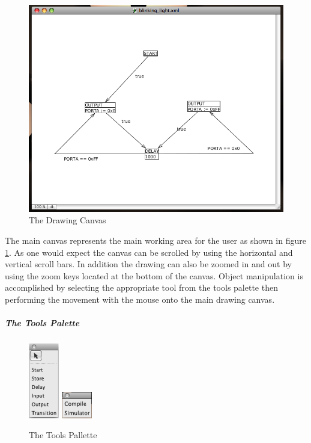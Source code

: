 \begin{figure}[htp]
    \centering
    \includegraphics[width=\imgmedium]{./images/plcedit_canvas.png}
    \caption{The Drawing Canvas}
    \label{fig:plcedit_canvas}
\end{figure}

The main canvas represents the main working area for the user as shown in figure \ref{fig:plcedit_canvas}. As one would expect the canvas can be scrolled by using the horizontal and vertical scroll bars. In addition the drawing can also be zoomed in and out by using the zoom keys located at the bottom of the canvas. Object manipulation is accomplished by selecting the appropriate tool from the tools palette then performing the movement with the mouse onto the main drawing canvas.

\subparagraph{The Tools Palette}

\begin{figure}[htp]
    \centering
    \includegraphics[width=50px]{./images/plcedit_tools.png}
    \includegraphics[width=50px]{./images/plcedit_actions.png}
    \caption{The Tools Pallette}
    \label{fig:plcedit_tools}
\end{figure}

